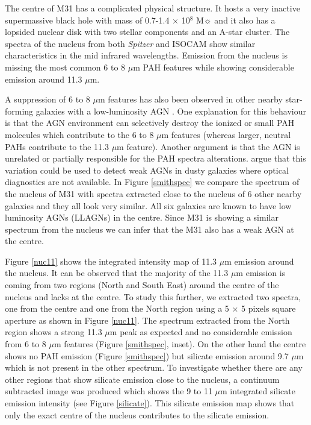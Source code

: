 	
The centre of M31 has a complicated physical structure. It hosts a very inactive supermassive black hole with  mass of 0.7-1.4 $\times$ 10$^8$ M$\sun$ \citep{Bacon2001} and it also has a lopsided nuclear disk \citep{Lauer1993} with two stellar components and an A-star cluster. The spectra of the nucleus from both {\em Spitzer} and ISOCAM show similar characteristics in the mid infrared wavelengths. Emission from the nucleus is missing the most common 6 to 8 $\mu$m PAH features while showing considerable emission around 11.3 $\mu$m. 

A suppression of 6 to 8 $\mu$m features has also been observed in other nearby star-forming galaxies with a low-luminosity AGN \citep{Smith:2007lr}. One explanation for this behaviour is that the AGN environment can selectively destroy the ionized or small PAH molecules which contribute to the 6 to 8 $\mu$m features (whereas larger, neutral PAHs contribute to the 11.3 $\mu$m feature). Another argument is that the AGN is unrelated or partially responsible for the PAH spectra alterations. \citet{Smith:2007lr} argue that this variation could be used to detect weak AGNs in dusty galaxies where optical diagnostics are not available. In Figure \ref{smithspec} we compare the spectrum of the nucleus of M31 with spectra extracted close to the nucleus of 6 other nearby galaxies and they all look very similar. All six galaxies are known to have low luminosity AGNs (LLAGNs) in the centre. Since M31 is showing a similar spectrum from the nucleus we can infer that the M31 also has a weak AGN at the centre.

Figure \ref{nuc11} shows the integrated intensity map of 11.3 $\mu$m emission around the nucleus. It can be observed that the majority of the 11.3 $\mu$m emission is coming from two regions (North and South East) around the centre of the nucleus and lacks at the centre. To study this further, we extracted two spectra, one from the centre and one from the North region using a 5 $\times$ 5 pixels square aperture as shown in Figure \ref{nuc11}. The spectrum extracted from the North region shows a strong 11.3 $\mu$m peak as expected and no considerable emission from 6 to 8 $\mu$m features (Figure \ref{smithspec}, inset). On the other hand the centre shows no PAH emission (Figure \ref{smithspec}) but silicate emission around 9.7 $\mu$m which is not present in the other spectrum. To investigate whether there are any other regions that show silicate emission close to the nucleus, a continuum subtracted image was produced which shows the 9 to 11 $\mu$m integrated silicate emission intensity (see Figure \ref{silicate}). This silicate emission map shows that only the exact centre of the nucleus contributes to the silicate emission. 

